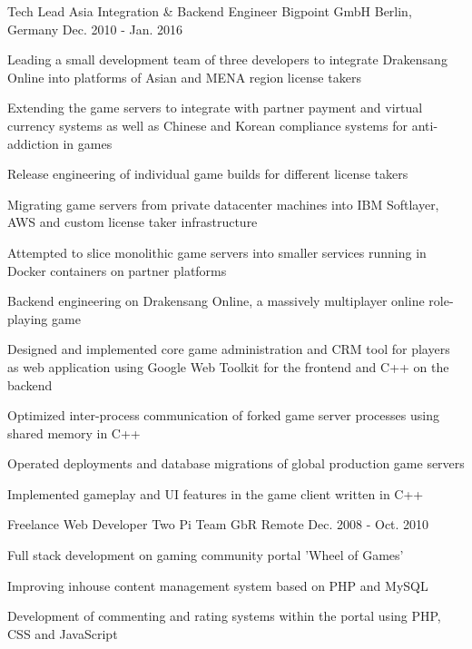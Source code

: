 \begin{cventries}
  \cventry
    {Tech Lead Asia Integration \& Backend Engineer} %
    {Bigpoint GmbH} %
    {Berlin, Germany} %
    {Dec. 2010 - Jan. 2016} %
    {
      \begin{cvitems} %
        \item {Leading a small development team of three developers to integrate Drakensang Online into platforms of Asian and MENA region license takers}
        \begin{cvsubitems}
          \item {Extending the game servers to integrate with partner payment and virtual currency systems as well as Chinese and Korean compliance systems for anti-addiction in games}
          \item {Release engineering of individual game builds for different license takers}
          \item {Migrating game servers from private datacenter machines into IBM Softlayer, AWS and custom license taker infrastructure}
          \item {Attempted to slice monolithic game servers into smaller services running in Docker containers on partner platforms}
        \end{cvsubitems}
        \item {Backend engineering on Drakensang Online, a massively multiplayer online role-playing game}
        \begin{cvsubitems}
          \item {Designed and implemented core game administration and CRM tool for players as web application using Google Web Toolkit for the frontend and C++ on the backend}
          \item {Optimized inter-process communication of forked game server processes using shared memory in C++}
          \item {Operated deployments and database migrations of global production game servers}
          \item {Implemented gameplay and UI features in the game client written in C++}
        \end{cvsubitems}
      \end{cvitems}
    }

  \cventry
    {Freelance Web Developer} %
    {Two Pi Team GbR} %
    {Remote} %
    {Dec. 2008 - Oct. 2010} %
    {
      \begin{cvitems} %
        \item {Full stack development on gaming community portal 'Wheel of Games'}
        \item {Improving inhouse content management system based on PHP and MySQL}
        \item {Development of commenting and rating systems within the portal using PHP, CSS and JavaScript}
      \end{cvitems}
    }

\end{cventries}
